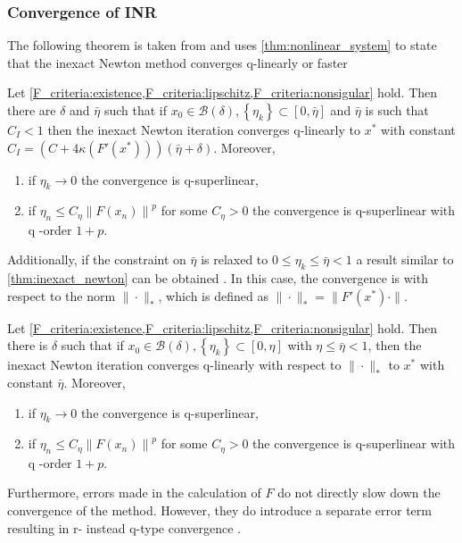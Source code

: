 \subsubsection{Convergence of INR}
The following theorem is taken from \cite[Theorem 6.1.2]{nonlinear_cg_Kelley_1995} and uses \cref{thm:nonlinear_system} to state that the inexact Newton method converges q-linearly or faster
\begin{theorem}
  Let \cref{F_criteria:existence,F_criteria:lipschitz,F_criteria:nonsigular} hold. Then there are $\delta$ and $\bar{\eta}$ such that if $x_0 \in \mathcal{B}(\delta),\left\{\eta_k\right\} \subset[0, \bar{\eta}]$ and $\bar{\eta}$ is such that $C_I < 1$ then the inexact Newton iteration converges q-linearly to $x^*$ with constant $C_I = \left(C + 4 \kappa(F'(x^*))\right)(\bar{\eta} + \delta)$. Moreover,
  \begin{enumerate}
    \item if $\eta_k \rightarrow 0$ the convergence is q-superlinear,
    \item if $\eta_n \leq C_\eta\left\|F\left(x_n\right)\right\|^p$ for some $C_\eta>0$ the convergence is q-superlinear with q -order $1+p$.
  \end{enumerate}
  \label{thm:inexact_newton}
\end{theorem}
Additionally, if the constraint on $\bar{\eta}$ is relaxed to $0 \leq \eta_k \leq \bar{\eta} < 1$ a result similar to \cref{thm:inexact_newton} can be obtained \cite[Theorem 6.1.4]{nonlinear_cg_Kelley_1995}. In this case, the convergence is with respect to the norm $\|\cdot\|_*$, which is defined as $\|\cdot\|_* = \|F'(x^*)\cdot\|$.
\begin{theorem}
  Let \cref{F_criteria:existence,F_criteria:lipschitz,F_criteria:nonsigular} hold. Then there is $\delta$ such that if $x_0 \in \mathcal{B}(\delta),\left\{\eta_k\right\} \subset[0, \eta]$ with $\eta\leq\bar{\eta}<1$, then the inexact Newton iteration converges q-linearly with respect to $\|\cdot\|_*$ to $x^*$ with constant $\bar{\eta}$. Moreover,
  \begin{enumerate}
    \item if $\eta_k \rightarrow 0$ the convergence is q-superlinear,
    \item if $\eta_n \leq C_\eta\left\|F\left(x_n\right)\right\|^p$ for some $C_\eta>0$ the convergence is q-superlinear with q -order $1+p$.
  \end{enumerate}
  \label{thm:inexact_newton_star}
\end{theorem}
Furthermore, errors made in the calculation of $F$ do not directly slow down the convergence of the method. However, they do introduce a separate error term resulting in r- instead q-type convergence \cite[Theorems 5.4.6, 6.1.5, 6.1.6]{nonlinear_cg_Kelley_1995}.

